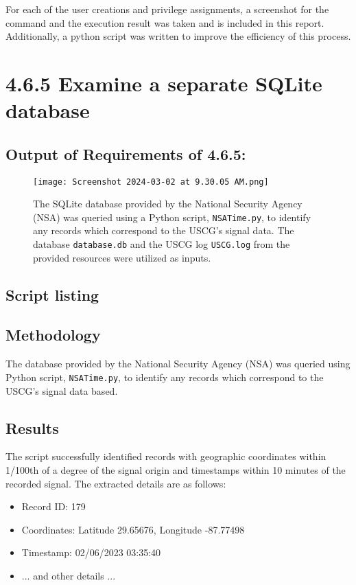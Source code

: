 \documentclass{article}
\begin{document}
For each of the user creations and privilege assignments, a screenshot for the command and the execution result was taken and is included in this report. Additionally, a python script was written to improve the efficiency of this process.

\section*{4.6.5 Examine a separate SQLite database}

\subsection*{Output of Requirements of 4.6.5:}
\begin{figure}[H]
    \centering
    \texttt{[image: Screenshot 2024-03-02 at 9.30.05 AM.png]}
    \caption{The SQLite database provided by the National Security Agency (NSA) was queried using a Python script, \texttt{NSATime.py}, to identify any records which correspond to the USCG's signal data. The database \texttt{database.db} and the USCG log \texttt{USCG.log} from the provided resources were utilized as inputs.}
\end{figure}

\subsection*{Script listing}



\subsection*{Methodology}
The database provided by the National Security Agency (NSA) was queried using Python script, \texttt{NSATime.py}, to identify any records which correspond to the USCG's signal data based.

\subsection*{Results}
The script successfully identified records with geographic coordinates within 1/100th of a degree of the signal origin and timestamps within 10 minutes of the recorded signal. The extracted details are as follows:

\begin{itemize}
    \item Record ID: 179
    \item Coordinates: Latitude 29.65676, Longitude -87.77498
    \item Timestamp: 02/06/2023 03:35:40
    \item ... and other details ...
\end{itemize}
\end{document}
